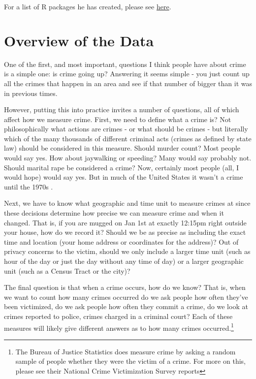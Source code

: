 \documentclass[
  12pt,
  openany]{book}
\begin{document}
For a list of R packages he has created, please see \href{https://jacobdkaplan.com/packages.html}{here}.

\hypertarget{ucrGeneral}{%
\chapter{Overview of the Data}\label{ucrGeneral}}

One of the first, and most important, questions I think people have about crime is a simple one: is crime going up? Answering it seems simple - you just count up all the crimes that happen in an area and see if that number of bigger than it was in previous times.

However, putting this into practice invites a number of questions, all of which affect how we measure crime. First, we need to define what a crime is? Not philosophically what actions are crimes - or what should be crimes - but literally which of the many thousands of different criminal acts (crimes as defined by state law) should be considered in this measure. Should murder count? Most people would say yes. How about jaywalking or speeding? Many would say probably not. Should marital rape be considered a crime? Now, certainly most people (all, I would hope) would say yes. But in much of the United States it wasn't a crime until the 1970s \citep{bennice2003marital, mcmahon2009criminalizing}.

Next, we have to know what geographic and time unit to measure crimes at since these decisions determine how precise we can measure crime and when it changed. That is, if you are mugged on Jan 1st at exactly 12:15pm right outside your house, how do we record it? Should we be as precise as including the exact time and location (your home address or coordinates for the address)? Out of privacy concerns to the victim, should we only include a larger time unit (such as hour of the day or just the day without any time of day) or a larger geographic unit (such as a Census Tract or the city)?

The final question is that when a crime occurs, how do we know? That is, when we want to count how many crimes occurred do we ask people how often they've been victimized, do we ask people how often they commit a crime, do we look at crimes reported to police, crimes charged in a criminal court? Each of these measures will likely give different answers as to how many crimes occurred.\footnote{The Bureau of Justice Statistics does measure crime by asking a random sample of people whether they were the victim of a crime. For more on this, please see their National Crime Victimization Survey reports}
\end{document}
